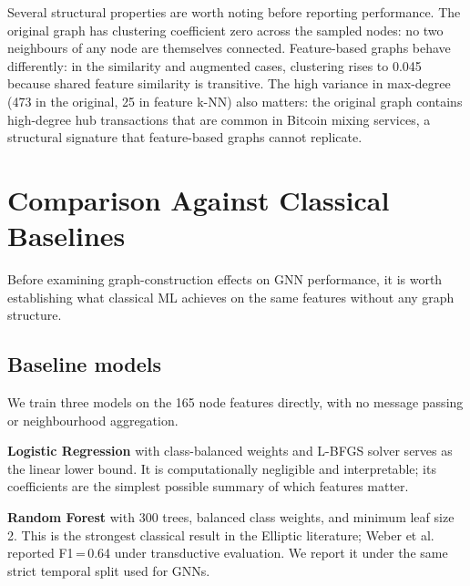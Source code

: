 Several structural properties are worth noting before reporting performance.
The original graph has clustering coefficient zero across the sampled nodes:
no two neighbours of any node are themselves connected. Feature-based graphs
behave differently: in the similarity and augmented cases, clustering rises to
0.045 because shared feature similarity is transitive. The high variance in
max-degree (473 in the original, 25 in feature k-NN) also matters: the
original graph contains high-degree hub transactions that are common in
Bitcoin mixing services, a structural signature that feature-based graphs
cannot replicate.



\section{Comparison Against Classical Baselines}
\label{sec:classical_comparison}

Before examining graph-construction effects on GNN performance, it is worth
establishing what classical ML achieves on the same features without any
graph structure.

\subsection{Baseline models}

We train three models on the 165 node features directly, with no message
passing or neighbourhood aggregation.

\textbf{Logistic Regression} with class-balanced weights and L-BFGS solver
serves as the linear lower bound. It is computationally negligible and
interpretable; its coefficients are the simplest possible summary of which
features matter.

\textbf{Random Forest} with 300 trees, balanced class weights, and minimum
leaf size 2. This is the strongest classical result in the Elliptic
literature; Weber et al.\ \citep{weber2019} reported F1\,=\,0.64 under
transductive evaluation. We report it under the same strict temporal split
used for GNNs.

